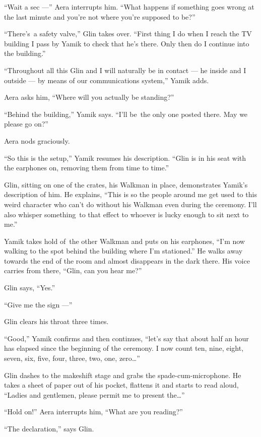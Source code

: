 \documentclass[twoside,11pt]{book}
\begin{document}
``Wait a sec ---'' Aera interrupts him. ``What happens if something goes wrong
at the last minute and you're not where you're supposed to be?''

``There's~a safety valve,'' Glin takes over. ``First thing I do when I reach the
TV building I pass by Yamik to check that he's there. Only then do I continue into the building.''

``Throughout all this Glin and I will naturally be in contact --- he inside and I outside ---  by means of
our communications system,'' Yamik adds.

Aera asks him, ``Where will you actually be standing?''

``Behind the building,'' Yamik says. ``I'll be~the only one posted
there.  May we please go on?''

Aera nods graciously.

``So this is the setup,'' Yamik resumes his description. ``Glin is in his seat
with the earphones on, removing them from time to time.''

Glin, sitting on one of the crates, his Walkman in place, demonstrates Yamik's description of him. He explains,
``This is so the{ }people around me get used to this weird
character who can't do without his Walkman even during the ceremony. I'll also whisper something~to that effect to
whoever is lucky enough to sit next to me.''

Yamik takes hold of~the other Walkman and puts on his earphones, ``I'm now walking to the spot behind the
building where I'm stationed.'' He walks away towards the end of the room and almost disappears in the
dark there. His voice carries from there, ``Glin, can you hear me?''

Glin says, ``Yes.''

``Give me the sign ---''

Glin clears his throat three times.

``Good,'' Yamik confirms and then continues, ``let's say that about half an hour
has elapsed since the beginning of the ceremony. I now count ten, nine, eight, seven, six, five, four, three, two, one,
zero{\ldots}''

Glin dashes to the makeshift stage and grabs the{ }spade-cum-microphone. He takes a sheet of paper out
of his pocket, flattens it and starts to read aloud, ``Ladies and gentlemen, please permit me to present
the{\ldots}''

``Hold on!'' Aera interrupts him, ``What are you reading?''

``The declaration,'' says Glin.
\end{document}
